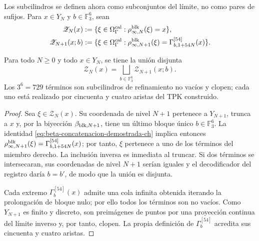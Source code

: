 Los subcilindros se definen ahora como subconjuntos del límite, no como pares
de sufijos. Para \(x\in Y_N\) y \(b\in\mathbb F_3^6\), sean
\begin{align}
 \mathscr Z_N(x)
   &:=\{\xi\in\Omega_\Gamma^{\rm cal}:
       \rho^{\rm blk}_{\infty,N}(\xi)=x\},
 \label{eq:cilindro-real-limite-ch}\\
 \mathscr Z_{N+1}(x;b)
   &:=\{\xi\in\Omega_\Gamma^{\rm cal}:
       \rho^{\rm blk}_{\infty,N+1}(\xi)
       =\Gamma_{b,1+54N}^{[54]}(x)\}.
 \label{eq:subcilindro-real-limite-ch}
\end{align}

\begin{theorem}
\label{thm:particion-729-subcilindros-ch}
Para todo \(N\ge0\) y todo \(x\in Y_N\), se tiene la unión disjunta
\begin{equation}
 \mathscr Z_N(x)=
 \bigsqcup_{b\in\mathbb F_3^6}\mathscr Z_{N+1}(x;b).
 \label{eq:particion-real-729-ch}
\end{equation}
Los \(3^6=729\) términos son subcilindros de refinamiento no vacíos y
clopen; cada uno está realizado por cincuenta y cuatro aristas del TPK
construido.
\end{theorem}

\begin{proof}
Sea \(\xi\in\mathscr Z_N(x)\). Su coordenada de nivel \(N+1\) pertenece a
\(Y_{N+1}\), trunca a \(x\) y, por la biyección
\(\beta_{{\rm blk},N+1}\), tiene un último bloque único
\(b\in\mathbb F_3^6\). La identidad
\eqref{eq:beta-concatenacion-demostrada-ch} implica entonces
\(\rho^{\rm blk}_{\infty,N+1}(\xi)
=\Gamma_{b,1+54N}^{[54]}(x)\); por tanto, \(\xi\) pertenece a uno de los
términos del miembro derecho. La inclusión inversa es inmediata al truncar.
Si dos términos se intersecaran, sus coordenadas de nivel \(N+1\) serían
iguales y el decodificador del registro daría \(b=b'\), de modo que la unión
es disjunta.

Cada extremo \(\Gamma_b^{[54]}(x)\) admite una cola infinita obtenida
iterando la prolongación de bloque nulo; por ello todos los términos son no
vacíos. Como \(Y_{N+1}\) es finito y discreto, son preimágenes de puntos por
una proyección continua del límite inverso y, por tanto, clopen. La propia
definición de \(\Gamma_b^{[54]}\) acredita sus cincuenta y cuatro aristas.
\end{proof}

